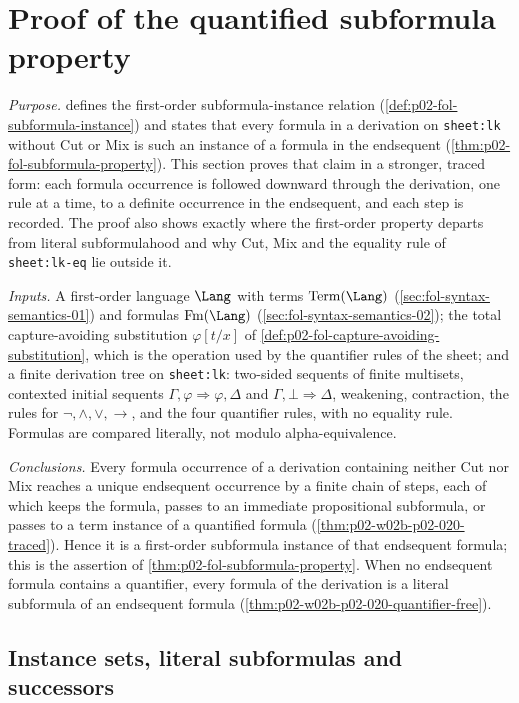 \section{Proof of the quantified subformula property}
\label{sec:p02-w02b-p02-020-subformula-proof}

\emph{Purpose.}   defines the
first-order subformula-instance relation
(\cref{def:p02-fol-subformula-instance}) and states that every formula in a
derivation on \texttt{sheet:lk} without Cut or Mix is
such an instance of a formula in the endsequent
(\cref{thm:p02-fol-subformula-property}).  This section proves that claim in a
stronger, traced form: each formula occurrence is followed downward through
the derivation, one rule at a time, to a definite occurrence in the endsequent,
and each step is recorded.  The proof also shows exactly where the first-order
property departs from literal subformulahood and why Cut, Mix and the
equality rule of \texttt{sheet:lk-eq} lie outside it.

\emph{Inputs.}  A first-order language \(\Lang\) with terms
\(\operatorname{Term}(\Lang)\) (\cref{sec:fol-syntax-semantics-01}) and formulas
\(\operatorname{Fm}(\Lang)\) (\cref{sec:fol-syntax-semantics-02}); the total
capture-avoiding substitution \(\varphi[t/x]\) of
\cref{def:p02-fol-capture-avoiding-substitution}, which is the operation used
by the quantifier rules of the sheet; and a finite derivation tree on
\texttt{sheet:lk}: two-sided sequents of finite
multisets, contexted initial sequents \(\Gamma,\varphi\Rightarrow\varphi,\Delta\)
and \(\Gamma,\bot\Rightarrow\Delta\), weakening, contraction, the rules for
\(\neg,\land,\lor,\to\), and the four quantifier rules, with no equality rule.
Formulas are compared literally, not modulo alpha-equivalence.

\emph{Conclusions.}  Every formula occurrence of a derivation containing
neither Cut nor Mix reaches a unique endsequent occurrence by a finite chain of
steps, each of which keeps the formula, passes to an immediate propositional
subformula, or passes to a term instance of a quantified formula
(\cref{thm:p02-w02b-p02-020-traced}).  Hence it is a first-order subformula
instance of that endsequent formula; this is the assertion of
\cref{thm:p02-fol-subformula-property}.  When no endsequent formula contains a
quantifier, every formula of the derivation is a literal subformula of an
endsequent formula (\cref{thm:p02-w02b-p02-020-quantifier-free}).

\subsection{Instance sets, literal subformulas and successors}
\label{sec:p02-w02b-p02-020-conventions}

